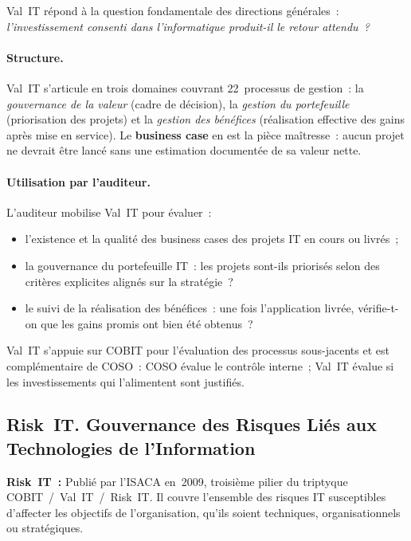 Val~IT répond à la question fondamentale des directions générales~: \emph{l'investissement
consenti dans l'informatique produit-il le retour attendu~?}

\paragraph{Structure.} Val~IT s'articule en trois domaines couvrant 22~processus de
gestion~: la \emph{gouvernance de la valeur} (cadre de décision), la \emph{gestion du
portefeuille} (priorisation des projets) et la \emph{gestion des bénéfices} (réalisation
effective des gains après mise en service). Le \textbf{business case} en est la pièce
maîtresse~: aucun projet ne devrait être lancé sans une estimation documentée de sa valeur
nette.

\paragraph{Utilisation par l'auditeur.} L'auditeur mobilise Val~IT pour évaluer~:
\begin{itemize}
    \item l'existence et la qualité des business cases des projets IT en cours ou livrés~;
    \item la gouvernance du portefeuille IT~: les projets sont-ils priorisés selon des critères
        explicites alignés sur la stratégie~?
    \item le suivi de la réalisation des bénéfices~: une fois l'application livrée, vérifie-t-on
        que les gains promis ont bien été obtenus~?
\end{itemize}

Val~IT s'appuie sur COBIT pour l'évaluation des processus sous-jacents et est complémentaire de
COSO~: COSO évalue le contrôle interne~; Val~IT évalue si les investissements qui l'alimentent
sont justifiés.

\subsection{Risk~IT. Gouvernance des Risques Liés aux Technologies de l'Information}
\label{subsec:risk-it}

\begin{boxdef}
\textbf{Risk~IT~:} Publié par l'ISACA en~2009, troisième pilier du triptyque
COBIT~/~Val~IT~/~Risk~IT. Il couvre l'ensemble des risques IT susceptibles d'affecter les
objectifs de l'organisation, qu'ils soient techniques, organisationnels ou stratégiques.
\end{boxdef}

